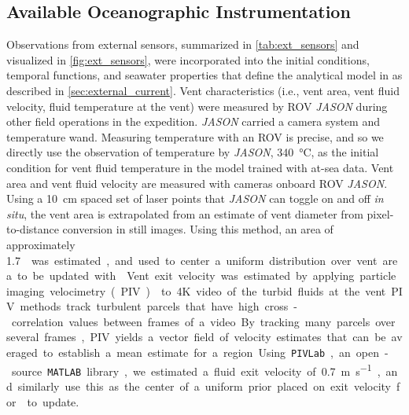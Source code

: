\subsection{Available Oceanographic Instrumentation}
\label{sec:ops_sensors}
Observations from external sensors, summarized in \cref{tab:ext_sensors} and visualized in \cref{fig:ext_sensors}, were incorporated into the initial conditions, temporal functions, and seawater properties that define the analytical model in \PHUMES as described in \cref{sec:external_current}. Vent characteristics (i.e., vent area, vent fluid velocity, fluid temperature at the vent) were measured by ROV \emph{JASON} during other field operations in the expedition. \emph{JASON} carried a camera system and temperature wand. Measuring temperature with an ROV is precise, and so we directly use the observation of temperature by \emph{JASON}, \SI{340}{\celsius}, as the initial condition for vent fluid temperature in the \PHUMES model trained with at-sea data. Vent area and vent fluid velocity are measured with cameras onboard ROV \emph{JASON}. Using a \SI{10}{\centi\meter} spaced set of laser points that \emph{JASON} can toggle on and off \emph{in situ}, the vent area is extrapolated from an estimate of vent diameter from pixel-to-distance conversion in still images. Using this method, an area of approximately \SI{1.7}{\meter\square} was estimated, and used to center a uniform distribution over vent area to be updated with \PHUMES. Vent exit velocity was estimated by applying particle imaging velocimetry (PIV) \autocite{zhang2019time} to 4K video of the turbid fluids at the vent. PIV methods track turbulent parcels that have high cross-correlation values between frames of a video. By tracking many parcels over several frames, PIV yields a vector field of velocity estimates that can be averaged to establish a mean estimate for a region. Using \verb|PIVLab|, an open-source \verb|MATLAB| library, we estimated a fluid exit velocity of \SI{0.7}{\meter\per\second}, and similarly use this as the center of a uniform prior placed on exit velocity for \PHUMES to update.

